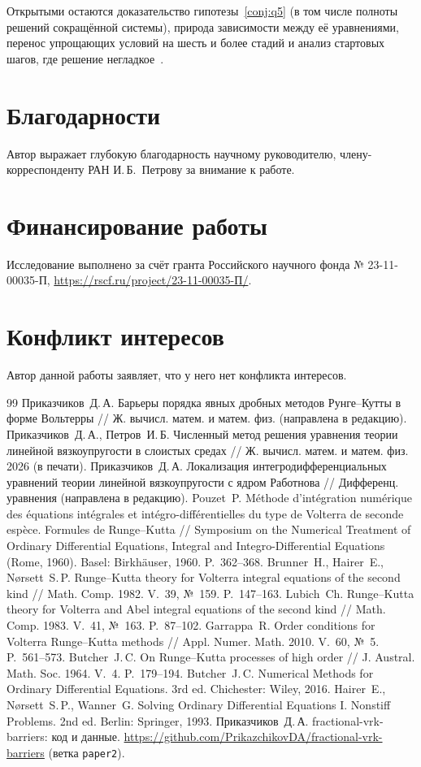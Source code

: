 \documentclass[11pt,a4paper]{article}
\theoremstyle{plain}
\theoremstyle{definition}
\begin{document}
Открытыми остаются доказательство гипотезы~\ref{conj:q5} (в том числе полноты решений сокращённой системы), природа зависимости между её уравнениями, перенос упрощающих условий на шесть и более стадий и анализ стартовых шагов, где решение негладкое~\cite{Lubich1983}.

\section*{Благодарности}
Автор выражает глубокую благодарность научному руководителю, члену-корреспонденту РАН И.\,Б.~Петрову за внимание к работе.

\section*{Финансирование работы}
Исследование выполнено за счёт гранта Российского научного фонда № 23-11-00035-П, \url{https://rscf.ru/project/23-11-00035-П/}.

\section*{Конфликт интересов}
Автор данной работы заявляет, что у него нет конфликта интересов.

\begin{thebibliography}{99}\small
{} Приказчиков~Д.\,А. Барьеры порядка явных дробных методов Рунге--Кутты в форме Вольтерры // Ж. вычисл. матем. и матем. физ. (направлена в редакцию).
 Приказчиков~Д.\,А., Петров~И.\,Б. Численный метод решения уравнения теории линейной вязкоупругости в слоистых средах // Ж. вычисл. матем. и матем. физ. 2026 (в печати).
 Приказчиков~Д.\,А. Локализация интегродифференциальных уравнений теории линейной вязкоупругости с ядром Работнова // Дифференц. уравнения (направлена в редакцию).
 Pouzet~P. Méthode d'intégration numérique des équations intégrales et intégro-différentielles du type de Volterra de seconde espèce. Formules de Runge--Kutta // Symposium on the Numerical Treatment of Ordinary Differential Equations, Integral and Integro-Differential Equations (Rome, 1960). Basel: Birkhäuser, 1960. P.~362--368.
 Brunner~H., Hairer~E., N{\o}rsett~S.\,P. Runge--Kutta theory for Volterra integral equations of the second kind // Math. Comp. 1982. V.~39, №~159. P.~147--163.
 Lubich~Ch. Runge--Kutta theory for Volterra and Abel integral equations of the second kind // Math. Comp. 1983. V.~41, №~163. P.~87--102.
 Garrappa~R. Order conditions for Volterra Runge--Kutta methods // Appl. Numer. Math. 2010. V.~60, №~5. P.~561--573.
 Butcher~J.\,C. On Runge--Kutta processes of high order // J. Austral. Math. Soc. 1964. V.~4. P.~179--194.
 Butcher~J.\,C. Numerical Methods for Ordinary Differential Equations. 3rd ed. Chichester: Wiley, 2016.
 Hairer~E., N{\o}rsett~S.\,P., Wanner~G. Solving Ordinary Differential Equations I. Nonstiff Problems. 2nd ed. Berlin: Springer, 1993.
 Приказчиков~Д.\,А. fractional-vrk-barriers: код и данные. \url{https://github.com/PrikazchikovDA/fractional-vrk-barriers} (ветка \texttt{paper2}).
\end{thebibliography}
\end{document}
